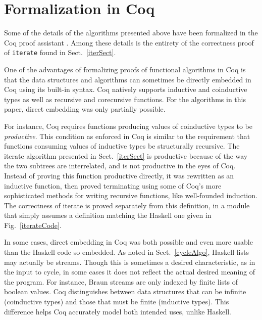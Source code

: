 \documentclass[envcountsect]{llncs}
\begin{document}
\section{Formalization in Coq}
\label{coqSect}

Some of the details of the algorithms presented above have been formalized in the Coq proof assistant \cite{coq,website}.
Among these details is the entirety of the correctness proof of {\tt iterate} found in Sect.~\ref{iterSect}.

One of the advantages of formalizing proofs of functional algorithms in Coq is that the data structures and algorithms can sometimes be directly embedded in Coq using its built-in syntax.
Coq natively supports inductive and coinductive types as well as recursive  and corecursive functions.
For the algorithms in this paper, direct embedding was only partially possible.

For instance, Coq requires functions producing values of coinductive types to be {\em productive}.
This condition as enforced in Coq is similar to the requirement that functions consuming values of inductive types be structurally recursive.
The iterate algorithm presented in Sect.~\ref{iterSect} is productive because of the way the two subtrees are interrelated, and is not productive in the eyes of Coq.
Instead of proving this function productive directly, it was rewritten as an inductive function, then proved terminating using some of Coq's more sophisticated methods for writing recursive functions, like well-founded induction.
The correctness of iterate is proved separately from this definition, in a module that simply assumes a definition matching the Haskell one given in Fig.~\ref{iterateCode}.

In some cases, direct embedding in Coq was both possible and even more usable than the Haskell code so embedded.
As noted in Sect.~\ref{cycleAlgo}, Haskell lists may actually be streams.
Though this is sometimes a desired characteristic, as in the input to cycle, in some cases it does not reflect the actual desired meaning of the program.
For instance, Braun streams are only indexed by finite lists of boolean values.
Coq distinguishes between data structures that can be infinite (coinductive types) and those that must be finite (inductive types).
This difference helps Coq accurately model both intended uses, unlike Haskell.

\end{document}
